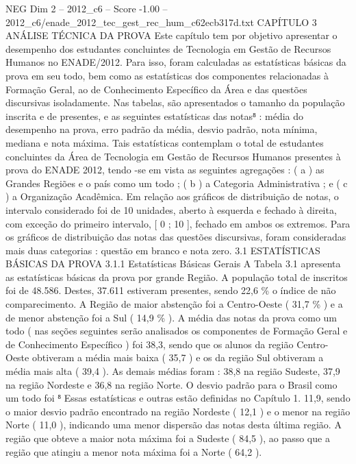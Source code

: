 \begin{textsample}{NEG Dim 2 – 2012\_c6 – Score -1.00 – 2012\_c6/enade\_2012\_tec\_gest\_rec\_hum\_c62ecb317d.txt}  \label{ex:f2_neg_185}
CAPÍTULO 3 ANÁLISE TÉCNICA DA PROVA Este capítulo tem por objetivo apresentar o desempenho dos estudantes concluintes de Tecnologia em Gestão de Recursos Humanos no ENADE/2012.
Para isso, foram calculadas as estatísticas básicas da prova em seu todo, bem como as estatísticas dos componentes relacionadas à Formação Geral, ao de Conhecimento Específico da Área e das questões discursivas isoladamente.
Nas tabelas, são apresentados o tamanho da população inscrita e de presentes, e as seguintes estatísticas das notas⁸ : média do desempenho na prova, erro padrão da média, desvio padrão, nota mínima, mediana e nota máxima.
Tais estatísticas contemplam o total de estudantes concluintes da Área de Tecnologia em Gestão de Recursos Humanos presentes à prova do ENADE 2012, tendo -se em vista as seguintes agregações : ( a ) as Grandes Regiões e o país como um todo ; ( b ) a Categoria Administrativa ; e ( c ) a Organização Acadêmica.
Em relação aos gráficos de distribuição de notas, o intervalo considerado foi de 10 unidades, aberto à esquerda e fechado à direita, com exceção do primeiro intervalo, [ 0 ; 10 ], fechado em ambos os extremos.
Para os gráficos de distribuição das notas das questões discursivas, foram consideradas mais duas categorias : questão em branco e nota zero. 3.1 ESTATÍSTICAS BÁSICAS DA PROVA 3.1.1 Estatísticas Básicas Gerais A Tabela 3.1 apresenta as estatísticas básicas da prova por grande Região.
A população total de inscritos foi de 48.586.
Destes, 37.611 estiveram presentes, sendo 22,6 \% o índice de não comparecimento.
A Região de maior abstenção foi a Centro-Oeste ( 31,7 \% ) e a de menor abstenção foi a Sul ( 14,9 \% ).
A média das notas da prova como um todo ( nas seções seguintes serão analisados os componentes de Formação Geral e de Conhecimento Específico ) foi 38,3, sendo que os alunos da região Centro-Oeste obtiveram a média mais baixa ( 35,7 ) e os da região Sul obtiveram a média mais alta ( 39,4 ).
As demais médias foram : 38,8 na região Sudeste, 37,9 na região Nordeste e 36,8 na região Norte.
O desvio padrão para o Brasil como um todo foi ⁸ Essas estatísticas e outras estão definidas no Capítulo 1. 11,9, sendo o maior desvio padrão encontrado na região Nordeste ( 12,1 ) e o menor na região Norte ( 11,0 ), indicando uma menor dispersão das notas desta última região.
A região que obteve a maior nota máxima foi a Sudeste ( 84,5 ), ao passo que a região que atingiu a menor nota máxima foi a Norte ( 64,2 ).

\end{textsample}
